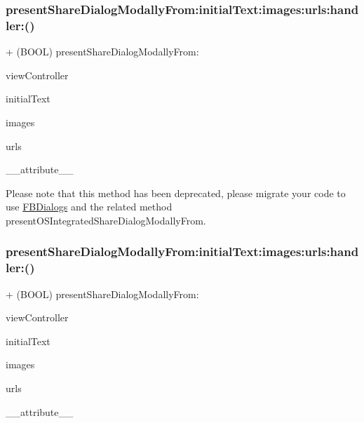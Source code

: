 \subsubsection{\texorpdfstring{present\+Share\+Dialog\+Modally\+From\+:initial\+Text\+:images\+:urls\+:handler\+:()}{presentShareDialogModallyFrom:initialText:images:urls:handler:()}\hspace{0.1cm}{\footnotesize\ttfamily [4/5]}}
{\footnotesize\ttfamily + (B\+O\+OL) present\+Share\+Dialog\+Modally\+From\+: \begin{DoxyParamCaption}\item[{(U\+I\+View\+Controller $\ast$)}]{view\+Controller }\item[{initialText:(N\+S\+String $\ast$)}]{initial\+Text }\item[{images:(N\+S\+Array $\ast$)}]{images }\item[{urls:(N\+S\+Array $\ast$)}]{urls }\item[{handler:((deprecated))}]{\+\_\+\+\_\+attribute\+\_\+\+\_\+ }\end{DoxyParamCaption}}

Please note that this method has been deprecated, please migrate your code to use {\ttfamily \hyperlink{interfaceFBDialogs}{F\+B\+Dialogs}} and the related method {\ttfamily present\+O\+S\+Integrated\+Share\+Dialog\+Modally\+From}. \mbox{\label{interfaceFBNativeDialogs_a0b1838513861cd340a972af6cc612ca5}} 
\subsubsection{\texorpdfstring{present\+Share\+Dialog\+Modally\+From\+:initial\+Text\+:images\+:urls\+:handler\+:()}{presentShareDialogModallyFrom:initialText:images:urls:handler:()}\hspace{0.1cm}{\footnotesize\ttfamily [5/5]}}
{\footnotesize\ttfamily + (B\+O\+OL) present\+Share\+Dialog\+Modally\+From\+: \begin{DoxyParamCaption}\item[{(U\+I\+View\+Controller $\ast$)}]{view\+Controller }\item[{initialText:(N\+S\+String $\ast$)}]{initial\+Text }\item[{images:(N\+S\+Array $\ast$)}]{images }\item[{urls:(N\+S\+Array $\ast$)}]{urls }\item[{handler:((deprecated))}]{\+\_\+\+\_\+attribute\+\_\+\+\_\+ }\end{DoxyParamCaption}}

